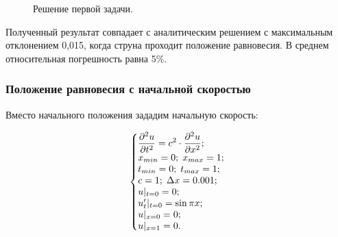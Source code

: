 \documentclass[12pt,a4paper,russian]{report}
\begin{document}
	\begin{figure}[h]
		\caption{Решение первой задачи.}
		\label{img:first_task}
	\end{figure}
	
	Полученный результат совпадает с аналитическим решением с максимальным отклонением 0,015, когда струна проходит положение равновесия. В среднем относительная погрешность равна 5\%.
	
	\newpage
	\subsubsection{Положение равновесия с начальной скоростью}
	
	Вместо начального положения зададим начальную скорость:
	
	\begin{equation*}
		\left\{\begin{array}{@{}l@{}}
			\displaystyle \frac{\partial^2u}{\partial t^2} = c^2 \cdot \frac{\partial^2u}{\partial x^2}; \\
			x_{min} = 0; \; x_{max} = 1; \\
			t_{min} = 0; \; t_{max} = 1; \\
			c = 1; \;  \Delta x = 0.001; \\
			u|_{t=0} = 0; \\
			u'_{t}|_{t=0} = \sin \pi x; \\
			u|_{x=0} = 0; \\
			u|_{x=1} = 0.
		\end{array}\right.\,
	\end{equation*}
	
\end{document}
